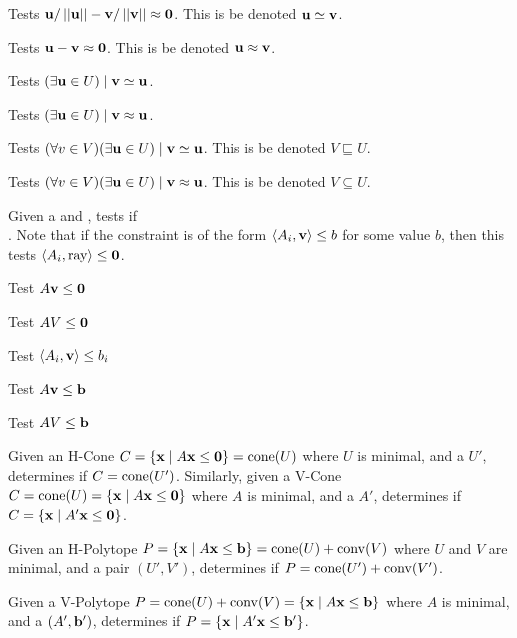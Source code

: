 Tests $\u/\norm{\u} - \v/\norm{\v} \approx \0 $.  This is be denoted $\u \simeq \v$.
\lstisequivalent

Tests $\u - \v \approx \0$.  This is be denoted $\u \approx \v$.
\lstisequal

Tests $(\exists \u \in U) \st \v \simeq \u$.
\lsthasequivalentmember

Tests $(\exists \u \in U) \st \v \approx \u$.
\lsthasequalmember

Tests $(\forall v \in V)(\exists \u \in U) \st \v \simeq \u$.  This is be denoted $V \sqsubseteq U$.
\lstsubsetmodeq

Tests $(\forall v \in V)(\exists \u \in U) \st \v \approx \u$.  This is be denoted $V \subseteq U$.
\lstsubset

Given a  and , tests if \\
.  Note that if the constraint is of the form $\ip{A_i}{\v} \leq b$ for some value $b$, then this tests $\ip{A_i}{\mli{ray}}\leq\0$.
\lstraysatisfieda

Test $A\v \leq \0$
\lstraysatisfiedb

Test $AV \leq \0$
\lstrayssatisfied

Test $\ip{A_i}{\v} \leq b_i$
\lstvecsatisfieda

Test $A\v \leq \b$
\lstvecsatisfiedb

Test $AV \leq \b$
\lstvecssatisfied

Given an H-Cone $C = \HC{A} = \cone(U)$ where $U$ is minimal, and a  $U'$, determines if $C = \cone(U')$.
Similarly, given a V-Cone $C = \cone(U) = \HC{A}$ where $A$ is minimal, and a  $A'$, determines if $C = \HC{A'}$.
\lstequivalentconerep

Given an H-Polytope $P = \HP{A}{\b} = \VP{U}{V}$ where $U$ and $V$ are minimal, and a pair $(U',V')$, determines if $P = \VP{U'}{V'}$.
\lstequivalenthpolyrep

Given a V-Polytope $P = \VP{U}{V} = \HP{A}{\b}$ where $A$ is minimal, and a  $(A',\b')$, determines if $P = \HP{A'}{\b'}$.
\lstequivalentvpolyrep



